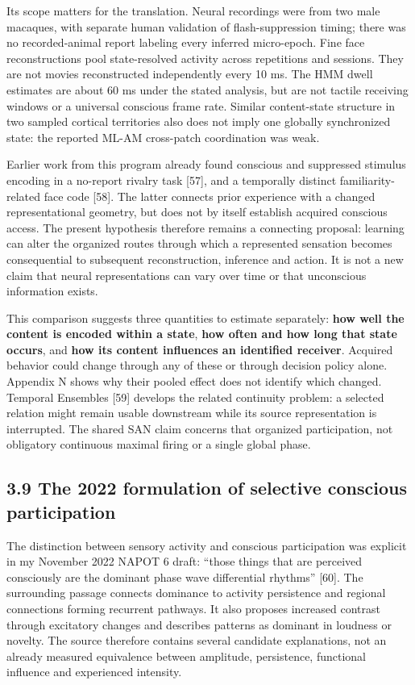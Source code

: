 \documentclass[
  american,
  11pt,
  letterpaper,
]{article}
\begin{document}
Its scope matters for the translation. Neural recordings were from two male macaques, with separate human validation of flash-suppression timing; there was no recorded-animal report labeling every inferred micro-epoch. Fine face reconstructions pool state-resolved activity across repetitions and sessions. They are not movies reconstructed independently every 10 ms. The HMM dwell estimates are about 60 ms under the stated analysis, but are not tactile receiving windows or a universal conscious frame rate. Similar content-state structure in two sampled cortical territories also does not imply one globally synchronized state: the reported ML-AM cross-patch coordination was weak.

Earlier work from this program already found conscious and suppressed stimulus encoding in a no-report rivalry task {[}57{]}, and a temporally distinct familiarity-related face code {[}58{]}. The latter connects prior experience with a changed representational geometry, but does not by itself establish acquired conscious access. The present hypothesis therefore remains a connecting proposal: learning can alter the organized routes through which a represented sensation becomes consequential to subsequent reconstruction, inference and action. It is not a new claim that neural representations can vary over time or that unconscious information exists.

This comparison suggests three quantities to estimate separately: \textbf{how well the content is encoded within a state}, \textbf{how often and how long that state occurs}, and \textbf{how its content influences an identified receiver}. Acquired behavior could change through any of these or through decision policy alone. Appendix N shows why their pooled effect does not identify which changed. Temporal Ensembles {[}59{]} develops the related continuity problem: a selected relation might remain usable downstream while its source representation is interrupted. The shared SAN claim concerns that organized participation, not obligatory continuous maximal firing or a single global phase.

\subsection{3.9 The 2022 formulation of selective conscious participation}\label{the-2022-formulation-of-selective-conscious-participation}

The distinction between sensory activity and conscious participation was explicit in my November 2022 NAPOT 6 draft: ``those things that are perceived consciously are the dominant phase wave differential rhythms'' {[}60{]}. The surrounding passage connects dominance to activity persistence and regional connections forming recurrent pathways. It also proposes increased contrast through excitatory changes and describes patterns as dominant in loudness or novelty. The source therefore contains several candidate explanations, not an already measured equivalence between amplitude, persistence, functional influence and experienced intensity.
\end{document}
